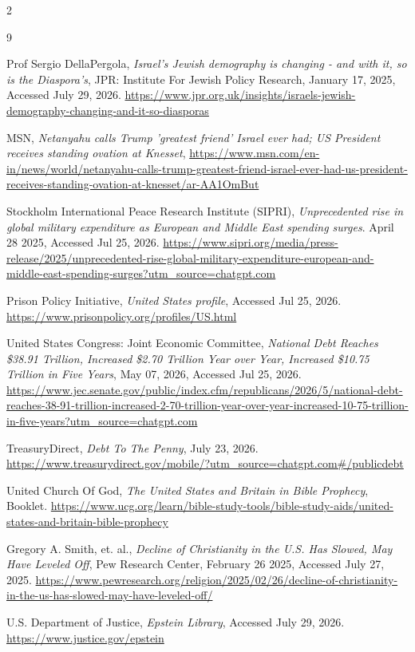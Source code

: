 \documentclass[10pt]{article}
\begin{document}
\begin{multicols}{2}
\begin{thebibliography}{9}
{	 Prof Sergio DellaPergola, \textit{Israel's Jewish demography is changing - and with it, so is the Diaspora's}, JPR: Institute For Jewish Policy Research, January 17, 2025, Accessed July 29, 2026. \url{https://www.jpr.org.uk/insights/israels-jewish-demography-changing-and-it-so-diasporas}
	
	 MSN, \textit{Netanyahu calls Trump 'greatest friend' Israel ever had; US President receives standing ovation at Knesset}, \url{https://www.msn.com/en-in/news/world/netanyahu-calls-trump-greatest-friend-israel-ever-had-us-president-receives-standing-ovation-at-knesset/ar-AA1OmBut}
	
	 Stockholm International Peace Research Institute (SIPRI), \textit{Unprecedented rise in global military expenditure as European and Middle East spending surges}. April 28 2025, Accessed Jul 25, 2026.  \url{https://www.sipri.org/media/press-release/2025/unprecedented-rise-global-military-expenditure-european-and-middle-east-spending-surges?utm_source=chatgpt.com}
	
	 Prison Policy Initiative, \textit{United States profile}, Accessed Jul 25, 2026. \url{https://www.prisonpolicy.org/profiles/US.html}
	
	 United States Congress: Joint Economic Committee, \textit{National Debt Reaches \$38.91 Trillion, Increased \$2.70 Trillion Year over Year, Increased \$10.75 Trillion in Five Years}, May 07, 2026, Accessed Jul 25, 2026. \url{https://www.jec.senate.gov/public/index.cfm/republicans/2026/5/national-debt-reaches-38-91-trillion-increased-2-70-trillion-year-over-year-increased-10-75-trillion-in-five-years?utm_source=chatgpt.com}
	
	 TreasuryDirect, \textit{Debt To The Penny}, July 23, 2026. \url{https://www.treasurydirect.gov/mobile/?utm_source=chatgpt.com#/publicdebt}
	
	 United Church Of God, \textit{The United States and Britain in Bible Prophecy}, Booklet. \url{https://www.ucg.org/learn/bible-study-tools/bible-study-aids/united-states-and-britain-bible-prophecy}
	
	 Gregory A. Smith, et. al., \textit{Decline of Christianity in the U.S. Has Slowed, May Have Leveled Off}, Pew Research Center, February 26 2025, Accessed July 27, 2025. \url{https://www.pewresearch.org/religion/2025/02/26/decline-of-christianity-in-the-us-has-slowed-may-have-leveled-off/}
	
	 U.S. Department of Justice, \textit{Epstein Library}, Accessed July 29, 2026. \url{https://www.justice.gov/epstein}

}
\end{thebibliography}

\end{multicols}


\end{document}
